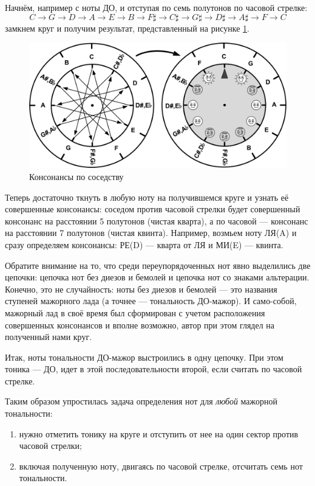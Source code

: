Начнём, например с ноты ДО, и отступая по семь полутонов по часовой стрелке:
\[
    C\rightarrow 
    G\rightarrow 
    D\rightarrow 
    A\rightarrow 
    E\rightarrow 
    B\rightarrow 
    {F\sharp}\rightarrow
    {C\sharp}\rightarrow
    {G\sharp}\rightarrow
    {D\sharp}\rightarrow
    {A\sharp}\rightarrow
    F\rightarrow 
    C
\]
замкнем круг и получим результат, представленный на рисунке \ref{fig:harmony:kvinto-kvarto:kons-rearrange}.

\begin{figure}[!ht]
    \centering
    \includegraphics[scale=0.7]{fig/kvinto-kvarto/kons-rearrange} 
    \caption{Консонансы по соседству}\label{fig:harmony:kvinto-kvarto:kons-rearrange}
\end{figure} 

Теперь достаточно ткнуть в любую ноту на получившемся круге и узнать её совершенные консонансы: соседом против часовой стрелки будет совершенный консонанс на расстоянии 5 полутонов (чистая кварта), а по часовой --- консонанс на расстоянии 7 полутонов (чистая квинта). Например, возмьем ноту ЛЯ(A) и сразу определяем консонансы: РЕ(D) --- кварта от ЛЯ и МИ(E) --- квинта.

Обратите внимание на то, что среди переупорядоченных нот явно выделились две цепочки: цепочка нот без диезов и бемолей и цепочка нот со знаками альтерации. Конечно, это не случайность: ноты без диезов и бемолей --- это названия ступеней мажорного лада (а точнее --- тональность ДО-мажор). И само-собой, мажорный лад в своё время был сформирован с учетом расположения совершенных консонансов и вполне возможно, автор при этом глядел на полученный нами круг.

Итак, ноты тональности ДО-мажор выстроились в одну цепочку. При этом тоника --- ДО, идет в этой последовательности второй, если считать по часовой стрелке.

Таким образом упростилась задача определения нот для \emph{любой} мажорной тональности: 
\begin{enumerate}
    \item нужно отметить тонику на круге и отступить от нее на один сектор против часовой стрелки;
    \item включая полученную ноту, двигаясь по часовой стрелке, отсчитать семь нот тональности.
\end{enumerate}

